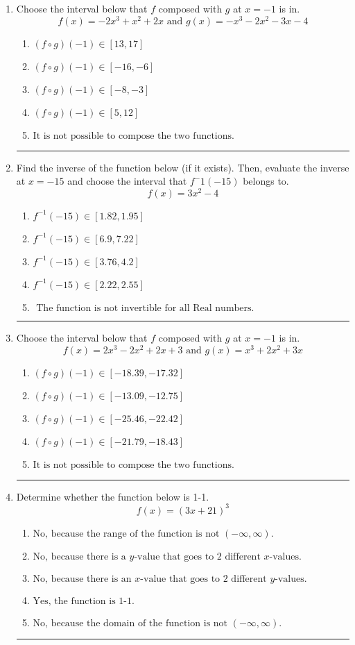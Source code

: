 \documentclass[14pt]{extbook}
\newcommand{\litem}[1]{\item#1\hspace*{-1cm}\rule{\textwidth}{0.4pt}}
\begin{document}
\begin{enumerate}
{\begin{enumerate}[label=\Alph*.]
\end{enumerate} }
\litem{
Choose the interval below that $f$ composed with $g$ at $x=-1$ is in.\[ f(x) = -2x^{3} + x^{2} +2 x \text{ and } g(x) = -x^{3} -2 x^{2} -3 x -4 \]\begin{enumerate}[label=\Alph*.]
\item \( (f \circ g)(-1) \in [13, 17] \)
\item \( (f \circ g)(-1) \in [-16, -6] \)
\item \( (f \circ g)(-1) \in [-8, -3] \)
\item \( (f \circ g)(-1) \in [5, 12] \)
\item \( \text{It is not possible to compose the two functions.} \)

\end{enumerate} }
\litem{
Find the inverse of the function below (if it exists). Then, evaluate the inverse at $x = -15$ and choose the interval that $f^-1(-15)$ belongs to.\[ f(x) = 3 x^2 - 4 \]\begin{enumerate}[label=\Alph*.]
\item \( f^{-1}(-15) \in [1.82, 1.95] \)
\item \( f^{-1}(-15) \in [6.9, 7.22] \)
\item \( f^{-1}(-15) \in [3.76, 4.2] \)
\item \( f^{-1}(-15) \in [2.22, 2.55] \)
\item \( \text{ The function is not invertible for all Real numbers. } \)

\end{enumerate} }
\litem{
Choose the interval below that $f$ composed with $g$ at $x=-1$ is in.\[ f(x) = 2x^{3} -2 x^{2} +2 x + 3 \text{ and } g(x) = x^{3} +2 x^{2} +3 x \]\begin{enumerate}[label=\Alph*.]
\item \( (f \circ g)(-1) \in [-18.39, -17.32] \)
\item \( (f \circ g)(-1) \in [-13.09, -12.75] \)
\item \( (f \circ g)(-1) \in [-25.46, -22.42] \)
\item \( (f \circ g)(-1) \in [-21.79, -18.43] \)
\item \( \text{It is not possible to compose the two functions.} \)

\end{enumerate} }
\litem{
Determine whether the function below is 1-1.\[ f(x) = (3 x + 21)^3 \]\begin{enumerate}[label=\Alph*.]
\item \( \text{No, because the range of the function is not $(-\infty, \infty)$.} \)
\item \( \text{No, because there is a $y$-value that goes to 2 different $x$-values.} \)
\item \( \text{No, because there is an $x$-value that goes to 2 different $y$-values.} \)
\item \( \text{Yes, the function is 1-1.} \)
\item \( \text{No, because the domain of the function is not $(-\infty, \infty)$.} \)

\end{enumerate} }
\end{enumerate}
\end{document}
